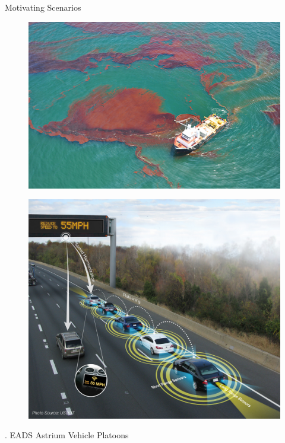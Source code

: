 \begin{frame}{Motivating Scenarios}
\begin{minipage}{0.45\textwidth}
\begin{figure}
		\end{figure}
	\end{minipage}
	\hspace{0.05cm}
	\begin{minipage}{0.45\textwidth}
		\begin{figure}
			\includegraphics[width=\textwidth]{figures/oil_spill.jpg}
		\end{figure}
		\begin{figure}
			\includegraphics[scale=0.20]{figures/Platooning.jpg}	
			\label{fig:Platooning}
		\end{figure}	
	\end{minipage} 

 .
 \hspace{0.2 cm}
  EADS Astrium 
\hspace{2.7 cm}
Vehicle Platoons
\\
\end{frame}
